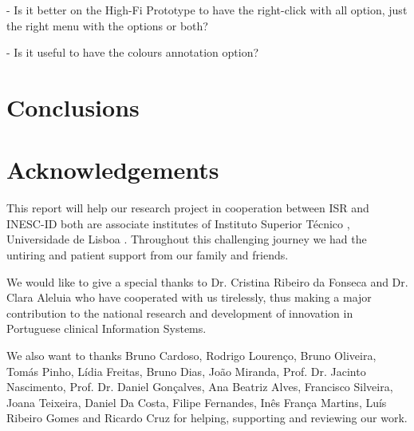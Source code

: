 - Is it better on the High-Fi Prototype to have the right-click with all option, just the right menu with the options or both?

- Is it useful to have the colours annotation option?

\clearpage

\section{Conclusions}

\clearpage

\section{Acknowledgements}

This report will help our research project in cooperation between ISR \cite{isr} and INESC-ID \cite{inescid} both are associate institutes of Instituto Superior T\'{e}cnico \cite{ist}, Universidade de Lisboa \cite{ul}. Throughout this challenging journey we had the untiring and patient support from our family and friends.

We would like to give a special thanks to Dr. Cristina Ribeiro da Fonseca and Dr. Clara Aleluia who have cooperated with us tirelessly, thus making a major contribution to the national research and development of innovation in Portuguese clinical Information Systems.

We also want to thanks Bruno Cardoso, Rodrigo Louren\c{c}o, Bruno Oliveira, Tom\'{a}s Pinho, L\'{i}dia Freitas, Bruno Dias, Jo\~{a}o Miranda, Prof. Dr. Jacinto Nascimento, Prof. Dr. Daniel Gon\c{c}alves, Ana Beatriz Alves, Francisco Silveira, Joana Teixeira, Daniel Da Costa, Filipe Fernandes, In\^{e}s Fran\c{c}a Martins, Lu\'{i}s Ribeiro Gomes and Ricardo Cruz for helping, supporting and reviewing our work.

\clearpage

\printbibliography



